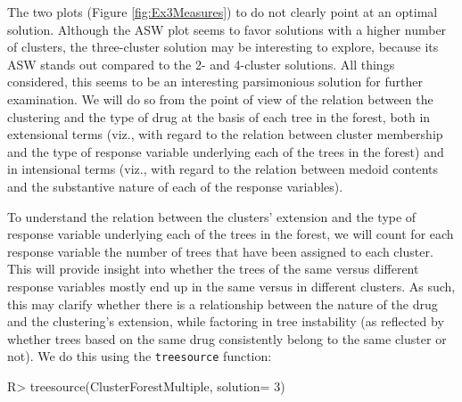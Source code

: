 The two plots (Figure \ref{fig:Ex3Measures}) to do not clearly point at an optimal solution. Although the ASW plot seems to favor solutions with a higher number of clusters, the three-cluster solution may be interesting to explore, because its ASW stands out compared to the 2- and 4-cluster solutions. All things considered, this seems to be an interesting parsimonious solution for further examination. We will do so from the point of view of the relation between the clustering and the type of drug at the basis of each tree in the forest, both in extensional terms (viz., with regard to the relation between cluster membership and the type of response variable underlying each of the trees in the forest) and in intensional terms (viz., with regard to the relation between medoid contents and the substantive nature of each of the response variables).

To understand the relation between the clusters' extension and the type of response variable underlying each of the trees in the forest, we will count for each response variable the number of trees that have been assigned to each cluster. This will provide insight into whether the trees of the same versus different response variables mostly end up in the same versus in different clusters. As such, this may clarify whether there is a relationship between the nature of the drug and the clustering's extension, while factoring in tree instability (as reflected by whether trees based on the same drug consistently belong to the same cluster or not). We do this using the \texttt{treesource} function:
\begin{example}
R> treesource(ClusterForestMultiple, solution= 3)
\end{example}

